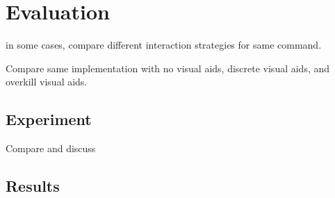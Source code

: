

\chapter{Evaluation}
\label{evaluation}

in some cases, compare different interaction strategies for same command.

Compare same implementation with no visual aids, discrete visual aids, and overkill visual aids.

\section{Experiment}

Compare and discuss

\section{Results}